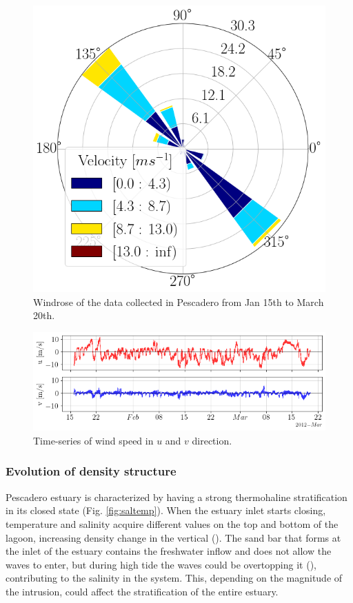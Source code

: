 \documentclass[11pt,letterpaper]{article}
\begin{document}
\begin{figure}[h!]
    \centering
    \includegraphics[scale=0.3]{Imagenes/windrose.png}
    \caption{Windrose of the data collected in Pescadero from Jan 15th to March 20th.}
    \label{fig:windrose}
\end{figure}

\begin{figure}[h!]
    \centering
    \includegraphics[width=\textwidth]{Imagenes/wind_vel.png}
    \caption{Time-series of wind speed in $u$ and $v$ direction.}
    \label{fig:windvel}
\end{figure}

\subsubsection{Evolution of density structure}

Pescadero estuary is characterized by having a strong thermohaline stratification in its closed state (Fig. \ref{fig:saltemp}). When the estuary inlet starts closing, temperature and salinity acquire different values on the top and bottom of the lagoon, increasing density change in the vertical (\cite{largier2015}). The sand bar that forms at the inlet of the estuary contains the freshwater inflow and does not allow the waves to enter, but during high tide the waves could be overtopping it (\cite{laudier2011measured}), contributing to the salinity in the system. This, depending on the magnitude of the intrusion, could affect the stratification of the entire estuary.\\
\end{document}
